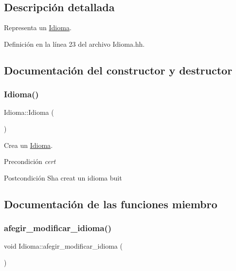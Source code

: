 \subsection{Descripción detallada}
Representa un \hyperlink{class_idioma}{Idioma}. 

Definición en la línea 23 del archivo Idioma.\+hh.



\subsection{Documentación del constructor y destructor}
\mbox{\label{class_idioma_a6722a621ce03825772493e67e5a17215}} 
\subsubsection{\texorpdfstring{Idioma()}{Idioma()}}
{\footnotesize\ttfamily Idioma\+::\+Idioma (\begin{DoxyParamCaption}{ }\end{DoxyParamCaption})}



Crea un \hyperlink{class_idioma}{Idioma}. 

\begin{DoxyPrecond}{Precondición}
{\itshape cert} 
\end{DoxyPrecond}
\begin{DoxyPostcond}{Postcondición}
S\textquotesingle{}ha creat un idioma buit 
\end{DoxyPostcond}


\subsection{Documentación de las funciones miembro}
\mbox{\label{class_idioma_a02661047ff31660f333b54f6d288ff19}} 
\subsubsection{\texorpdfstring{afegir\+\_\+modificar\+\_\+idioma()}{afegir\_modificar\_idioma()}}
{\footnotesize\ttfamily void Idioma\+::afegir\+\_\+modificar\+\_\+idioma (\begin{DoxyParamCaption}{ }\end{DoxyParamCaption})}



